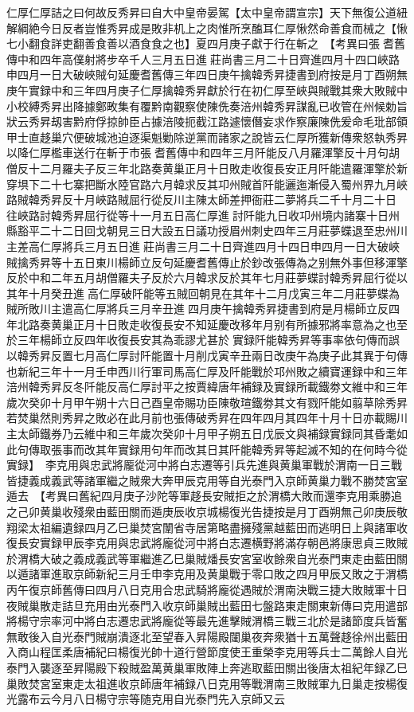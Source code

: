 仁厚仁厚詰之曰何故反秀昇曰自大中皇帝晏駕【太中皇帝謂宣宗】天下無復公道紐解綱絶今日反者豈惟秀昇成是敗非机上之肉惟所烹醢耳仁厚愀然命善食而械之【愀七小翻食詳吏翻善食善以酒食食之也】夏四月庚子獻于行在斬之　【考異曰張耆舊傳中和四年高僕射將步卒千人三月五日進莊尚書三月二十日齊進四月十四口峽路申四月一日大破峽賊句延慶耆舊傳三年四日庚午擒韓秀昇捷書到府按是月丁酉朔無庚午實録中和三年四月庚子仁厚擒韓秀昇獻於行在初仁厚至峽與賊戰其衆大敗賊中小校縛秀昇出降據鄭畋集有覆黔南觀察使陳侁奏涪州韓秀昇謀亂已收管在州候勅旨狀云秀昇刼害黔府俘掠帥臣占據涪陵扼截江路遽懷僭妄求作察廉陳侁爰命毛玭部領甲士直趍巢穴便破城池迫逐渠魁勦除逆黨而諸家之說皆云仁厚所獲新傳衆怒執秀昇以降仁厚檻車送行在斬于市張耆舊傳中和四年三月阡能反八月羅渾擎反十月句胡僧反十二月羅夫子反三年北路奏黄巢正月十日敗走收復長安正月阡能遣羅渾擎於新穿埧下二十七寨把斷水陸官路六月韓求反其卭州賊首阡能邐迤漸侵入蜀州界九月峽路賊韓秀昇反十月峽路賊屈行從反川主陳太師差押衙莊二夢將兵二千十月二十日往峽路討韓秀昇屈行從等十一月五日高仁厚進討阡能九日收卭州境内諸寨十日州縣豁平二十二日回戈朝見三日大設五日議功授眉州刺史四年三月莊夢蝶退至忠州川主差高仁厚將兵三月五日進莊尚書三月二十日齊進四月十四日申四月一日大破峽賊擒秀昇等十五日東川楊師立反句延慶耆舊傳止於鈔改張傳為之别無外事但移渾擎反於中和二年五月胡僧羅夫子反於六月韓求反於其年七月莊夢蝶討韓秀昇屈行從以其年十月癸丑進高仁厚破阡能等五賊回朝見在其年十二月戊寅三年二月莊夢蝶為賊所敗川主遣高仁厚將兵三月辛丑進四月庚午擒韓秀昇捷書到府是月楊師立反四年北路奏黄巢正月十日敗走收復長安不知延慶改移年月别有所據邪將率意為之也至於三年楊師立反四年收復長安其為乖謬尤甚於實録阡能韓秀昇等事率依句傳而誤以韓秀昇反置七月高仁厚討阡能置十月削戊寅辛丑兩日改庚午為庚子此其異于句傳也新紀三年十一月壬申西川行軍司馬高仁厚及阡能戰於邛州敗之續寶運録中和三年涪州韓秀昇反冬阡能反高仁厚討平之按賈緯唐年補録及實録所載鐵劵文維中和三年歲次癸卯十月甲午朔十六日己酉皇帝賜功臣陳敬瑄鐵劵其文有戮阡能如翦草除秀昇若焚巢然則秀昇之敗必在此月前也張傳破秀昇在四年四月其四年十月十日亦載賜川主太師鐵券乃云維中和三年歲次癸卯十月甲子朔五日戊辰文與補録實録同其昏耄如此句傳取張事而改其年實録用句年而改其日其阡能韓秀昇等起滅不知的在何時今從實録】　李克用與忠武將龎從河中將白志遷等引兵先進與黄巢軍戰於渭南一日三戰皆捷義成義武等諸軍繼之賊衆大奔甲辰克用等自光泰門入京師黄巢力戰不勝焚宮室遁去　【考異曰舊紀四月庚子沙陀等軍趍長安賊拒之於渭橋大敗而還李克用乘勝追之己卯黄巢收殘衆由藍田關而遁庚辰收京城楊復光告捷按是月丁酉朔無己卯庚辰敬翔梁太祖編遺録四月乙巳巢焚宮闈省寺居第略盡擁殘黨越藍田而逃明日上與諸軍收復長安實録甲辰李克用與忠武將龐從河中將白志遷横野將滿存朝邑將康思貞三敗賊於渭橋大破之義成義武等軍繼進乙巳巢賊燔長安宮室收餘衆自光泰門東走由藍田關以遁諸軍進取京師新紀三月壬申李克用及黄巢戰于零口敗之四月甲辰又敗之于渭橋丙午復京師舊傳曰四月八日克用合忠武騎將龐從遇賊於渭南決戰三捷大敗賊軍十日夜賊巢散走詰旦充用由光泰門入收京師巢賊出藍田七盤路東走關東新傳曰克用遣部將楊守宗率河中將白志遷忠武將龐從等最先進擊賊渭橋三戰三北於是諸節度兵皆奮無敢後入自光泰門賊崩潰逐北至望春入昇陽殿闥巢夜奔衆猶十五萬聲趍徐州出藍田入商山程匡柔唐補紀曰楊復光帥十道行營節度使王重榮李克用等兵士二萬餘人自光泰門入襲逐至昇陽殿下殺賊盈萬黄巢軍敗陣上奔逃取藍田關出後唐太祖紀年録乙巳巢敗焚宮室東走太祖進收京師唐年補録八日克用等戰渭南三敗賊軍九日巢走按楊復光露布云今月八日楊守宗等随克用自光泰門先入京師又云